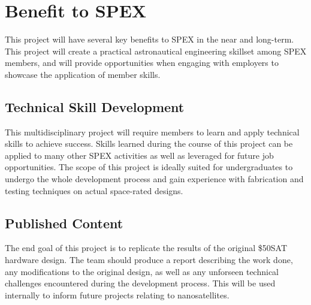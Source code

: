 \documentclass[conference]{IEEEtran} %
\begin{document}

\section{Benefit to SPEX}
\label{sec:benefit}

This project will have several key benefits to SPEX in the near and long-term.
This project will create a practical astronautical engineering skillset among SPEX members, and will provide opportunities when engaging with employers to showcase the application of member skills.


\subsection{Technical Skill Development}
\label{subsec:technicalSkills}
This multidisciplinary project will require members to learn and apply technical skills to achieve success.
Skills learned during the course of this project can be applied to many other SPEX activities as well as leveraged for future job opportunities.
The scope of this project is ideally suited for undergraduates to undergo the whole development process and gain experience with fabrication and testing techniques on actual space-rated designs.


\subsection{Published Content}
\label{subsec:PublishedContent}
The end goal of this project is to replicate the results of the original \$50SAT hardware design.
The team should produce a report describing the work done, any modifications to the original design, as well as any unforseen technical challenges encountered during the development process.
This will be used internally to inform future projects relating to nanosatellites.
\end{document}
